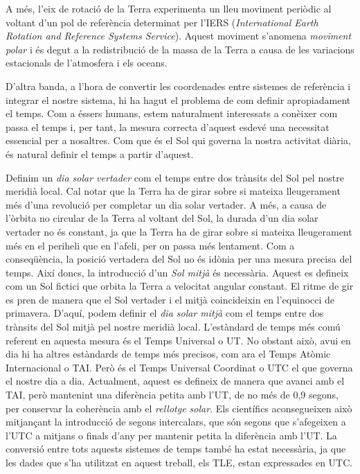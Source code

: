 \documentclass{article}
\begin{document}
A més, l'eix de rotació de la Terra experimenta un lleu moviment periòdic al voltant d'un pol de referència determinat per l'IERS (\emph{International Earth Rotation and Reference Systems Service}). Aquest moviment s'anomena \emph{moviment polar} i és degut a la redistribució de la massa de la Terra a causa de les variacions estacionals de l'atmosfera i els oceans.

D'altra banda, a l'hora de convertir les coordenades entre sistemes de referència i integrar el nostre sistema, hi ha hagut el problema de com definir apropiadament el temps. Com a éssers humans, estem naturalment interessats a conèixer com passa el temps i, per tant, la mesura correcta d'aquest esdevé una necessitat essencial per a nosaltres. Com que és el Sol qui governa la nostra activitat diària, és natural definir el temps a partir d'aquest.

Definim un \emph{dia solar vertader} com el temps entre dos trànsits del Sol pel nostre meridià local. Cal notar que la Terra ha de girar sobre si mateixa lleugerament més d'una revolució per completar un dia solar vertader. A més, a causa de l'òrbita no circular de la Terra al voltant del Sol, la durada d'un dia solar vertader no és constant, ja que la Terra ha de girar sobre si mateixa lleugerament més en el periheli que en l'afeli, per on passa més lentament. Com a conseqüència, la posició vertadera del Sol no és idònia per una mesura precisa del temps. Així doncs, la introducció d'un \emph{Sol mitjà} és necessària. Aquest es defineix com un Sol fictici que orbita la Terra a velocitat angular constant. El ritme de gir es pren de manera que el Sol vertader i el mitjà coincideixin en l'equinocci de primavera. D'aquí, podem definir el \emph{dia solar mitjà} com el temps entre dos trànsits del Sol mitjà pel nostre meridià local. L'estàndard de temps més comú referent en aquesta mesura és el Temps Universal o UT. No obstant això, avui en dia hi ha altres estàndards de temps més precisos, com ara el Temps Atòmic Internacional o TAI. Però és el Temps Universal Coordinat o UTC el que governa el nostre dia a dia. Actualment, aquest es defineix de manera que avanci amb el TAI, però mantenint una diferència petita amb l'UT, de no més de 0,9 segons, per conservar la coherència amb el \emph{rellotge solar}. Els científics aconsegueixen això mitjançant la introducció de segons intercalars, que són segons que s'afegeixen a l'UTC a mitjans o finals d'any per mantenir petita la diferència amb l'UT. La conversió entre tots aquests sistemes de temps també ha estat necessària, ja que les dades que s'ha utilitzat en aquest treball, els TLE, estan expressades en UTC.
\end{document}
